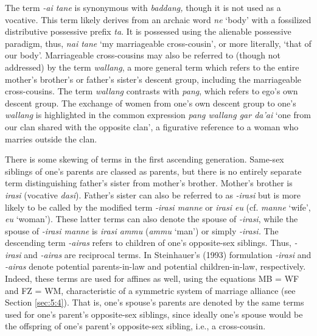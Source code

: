 The term \textit{-ai tane} is synonymous with \textit{baddang,} though it is not used as a vocative\textit{.} This term likely derives from an archaic word \textit{ne} `body' with a fossilized distributive possessive prefix \textit{ta}.\textit{} It is possessed using the alienable possessive paradigm, thus, \textit{nai tane} `my marriageable cross-cousin', or more literally, `that of our body'. Marriageable cross-cousins may also be referred to (though not addressed) by the term \textit{wallang}, a more general term which refers to the entire mother's brother's or father's sister's descent group, including the marriageable cross-cousins. The term \textit{wallang} contrasts with \textit{pang}, which refers to ego's own descent group. The exchange of women from one's own descent group to one's \textit{wallang} is highlighted in the common expression \textit{pang wallang gar da'ai} `one from our clan shared with the opposite clan', a figurative reference to a woman who marries outside the clan. 


There is some skewing of terms in the first ascending generation. Same-sex siblings of one's parents are classed as parents, but there is no entirely separate term distinguishing father's sister from mother's brother. Mother's brother is \textit{irasi} (vocative \textit{dasi}). Father's sister can also be referred to as \textit{-irasi} but is more likely to be called by the modified term \textit{-irasi manne} or \textit{irasi eu} (cf. \textit{manne} `wife', \textit{eu} `woman'). These latter terms can also denote the spouse of \textit{-irasi}, while the spouse of \textit{-irasi manne} is \textit{irasi ammu} (\textit{ammu} `man') or simply \textit{-irasi.} The descending term \textit{-airas} refers to children of one's opposite-sex siblings. Thus, \textit{-irasi} and \textit{-airas} are reciprocal terms. In Steinhauer's (1993) formulation \textit{-irasi} and \textit{-airas} denote potential parents-in-law and potential children-in-law, respectively. Indeed, these terms are used for affines as well, using the equations MB = WF and FZ = WM, characteristic of a symmetric system of marriage alliance (see Section \ref{sec:5:4}). That is, one's spouse's parents are denoted by the same terms used for one's parent's opposite-sex siblings, since ideally one's spouse would be the offspring of one's parent's opposite-sex sibling, i.e., a cross-cousin. 

